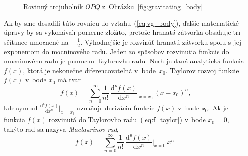 \documentclass[a4paper,12pt]{book}
\newcommand{\diff}{\mathrm d}
\begin{document}
\begin{figure}
\centering

\caption{Rovinný trojuholník $OPQ$ z~Obrázku~\ref{fig:gravitating_body}}
\label{fig:distance_l}
\end{figure}

Ak by sme dosadili túto rovnicu do vzťahu~(\ref{eq:vg_body}), ďalšie
matematické úpravy by sa vykonávali pomerne zložito, pretože hranatá zátvorka
obsahuje tri sčítance umocnené na~$-\frac{1}{2}$.  Výhodnejšie je rozvinúť
hranatú zátvorku spolu s~jej exponentom do mocninového radu.  Jeden zo spôsobov
rozvinutia funkcie do mocninového radu je pomocou Taylorovho radu.  Nech je 
daná analytická funkcia $f(x)$, ktorá je nekonečne diferencovateľná 
v~bode~$x_0$.  Taylorov rozvoj funkcie~$f(x)$ v~bode $x_0$ má tvar
%
\begin{equation}
\label{eq:f_taylor}
f(x) = \sum_{n = 0}^\infty \frac{1}{n!} \, \frac{\diff^n f(x)}{\diff x^n} 
\bigg\lvert_{x = x_0} \, (x - x_0)^n{,}
\end{equation}
%
kde symbol $\frac{\diff^n f(x)}{\diff x^n} \Big\lvert_{x = x_0}$ označuje 
deriváciu funkcie $f(x)$ v~bode $x_0$.  Ak je funkcia $f(x)$ rozvinutá do 
Taylorovho radu~(\ref{eq:f_taylor}) v~bode $x_0 = 0$, takýto rad sa nazýva 
\emph{Maclaurinov rad},
%
\begin{equation}
f(x) = \sum_{n = 0}^\infty \frac{1}{n!} \, \frac{\diff^n f(x)}{\diff x^n} 
\bigg\lvert_{x = 0} \, x^n{.}
\end{equation}
\end{document}
